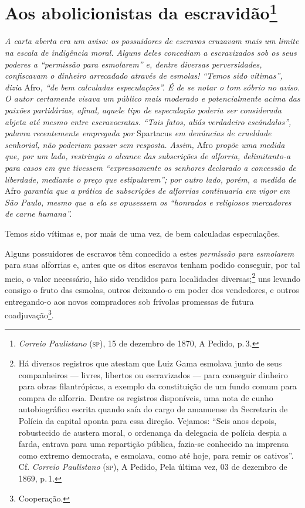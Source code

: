 \chapter{Aos abolicionistas da escravidão\footnote{\emph{Correio Paulistano} (\textsc{sp}), 15 de dezembro de 1870, A Pedido,
  p.\,3.}} %

\begin{didascalia}
\emph{A carta aberta era um aviso: os possuidores de escravos cruzavam
mais um limite na escala de indigência moral. Alguns deles concediam a
escravizados sob os seus poderes a ``permissão para esmolarem'' e, dentre
diversas perversidades, confiscavam o dinheiro arrecadado através de
esmolas! ``Temos sido vítimas'', dizia} Afro\emph{, ``de bem calculadas
especulações''. É de se notar o tom sóbrio no aviso. O autor certamente
visava um público mais moderado e potencialmente acima das paixões
partidárias, afinal, aquele tipo de especulação poderia ser considerada
abjeta até mesmo entre escravocratas. ``Tais fatos, aliás verdadeiro
escândalos'', palavra recentemente empregada por} Spartacus \emph{em
denúncias de crueldade senhorial, não poderiam passar sem resposta.
Assim,} Afro \emph{propõe uma medida que, por um lado, restringia o
alcance das subscrições de alforria, delimitanto-a para casos em que
tivessem ``expressamente os senhores declarado a concessão de liberdade,
mediante o preço que estipularem''; por outro lado, porém, a medida de}
Afro \emph{garantia que a prática de subscrições de alforrias
continuaria em vigor em São Paulo, mesmo que a ela se opusessem os
``honrados e religiosos mercadores de carne humana''.}
\end{didascalia}


Temos sido vítimas e, por mais de uma vez, de bem calculadas
especulações.

Alguns possuidores de escravos têm concedido a estes \emph{permissão
para esmolarem} para suas alforrias e, antes que os ditos escravos
tenham podido conseguir, por tal meio, o valor necessário, hão sido
vendidos para localidades diversas;\footnote{ Há diversos registros que
  atestam que Luiz Gama esmolava junto de seus companheiros --- livres,
  libertos ou escravizados --- para conseguir dinheiro para obras
  filantrópicas, a exemplo da constituição de um fundo comum para compra
  de alforria. Dentre os registros disponíveis, uma nota de cunho
  autobiográfico escrita quando saía do cargo de amanuense da Secretaria
  de Polícia da capital aponta para essa direção. Vejamos: ``Seis anos
  depois, robustecido de austera moral, o ordenança da delegacia de
  polícia despia a farda, entrava para uma repartição pública, fazia-se
  conhecido na imprensa como extremo democrata, e esmolava, como até
  hoje, para remir os cativos''. Cf. \emph{Correio Paulistano} (\textsc{sp}), A
  Pedido, Pela última vez, 03 de dezembro de 1869, p.\,1.} uns levando consigo o
fruto das esmolas, outros deixando-o em poder dos vendedores, e outros
entregando-o aos novos compradores sob frívolas promessas de futura
coadjuvação\footnote{ Cooperação.}.

